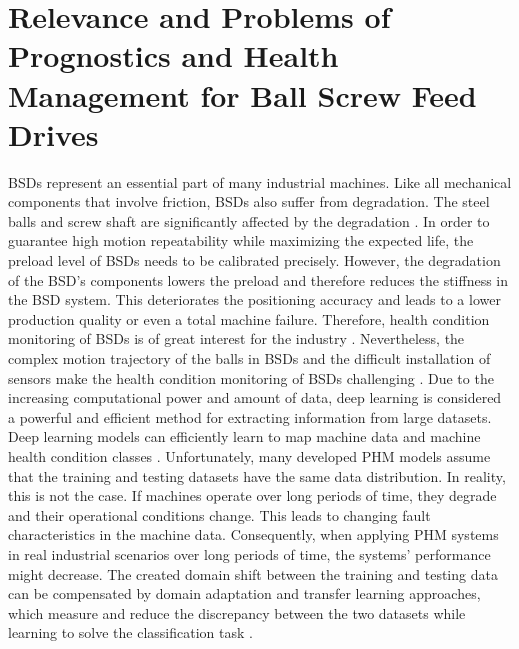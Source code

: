 \section{Relevance and Problems of Prognostics and Health Management for Ball Screw Feed Drives}
BSDs represent an essential part of many industrial machines. Like all mechanical components that involve friction, BSDs also suffer from degradation. The steel balls and screw shaft are significantly affected by the degradation \cite{Pandhare2021}. In order to guarantee high motion repeatability while maximizing the expected life, the preload level of BSDs needs to be calibrated precisely. However, the degradation of the BSD's components lowers the preload and therefore reduces the stiffness in the BSD system. This deteriorates the positioning accuracy and leads to a lower production quality or even a total machine failure. Therefore, health condition monitoring of BSDs is of great interest for the industry \cite{Pandhare2021}. Nevertheless, the complex motion trajectory of the balls in BSDs and the difficult installation of sensors make the health condition monitoring of BSDs challenging \cite{LiPin2018}. Due to the increasing computational power and amount of data, deep learning is considered a powerful and efficient method for extracting information from large datasets. Deep learning models can efficiently learn to map machine data and machine health condition classes \cite{ZHAO2019213}. Unfortunately, many developed PHM models assume that the training and testing datasets have the same data distribution. In reality, this is not the case. If machines operate over long periods of time, they degrade and their operational conditions change. This leads to changing fault characteristics in the machine data. Consequently, when applying PHM systems in real industrial scenarios over long periods of time, the systems' performance might decrease. The created domain shift between the training and testing data can be compensated by domain adaptation and transfer learning approaches, which measure and reduce the discrepancy between the two datasets while learning to solve the classification task \cite{AZAMFAR2020103932}.


